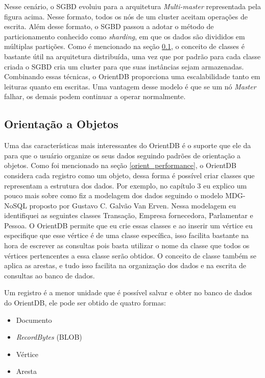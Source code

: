 	Nesse cenário, o SGBD evoluiu para a arquitetura \textit{Multi-master} representada pela figura acima. Nesse formato, todos os nós de um cluster aceitam operações de escrita. Além desse formato, o SGBD passou a adotar o método de particionamento conhecido como \textit{sharding}, em que os dados são divididos em múltiplas partições. Como é mencionado na seção \ref{orient_object}, o conceito de classes é bastante útil na arquitetura distribuída, uma vez que por padrão para cada classe criada o SGBD cria um cluster para que suas instâncias sejam armazenadas. Combinando essas técnicas, o OrientDB proporciona uma escalabilidade tanto em leituras quanto em escritas. Uma vantagem desse modelo é que se um nó \textit{Master} falhar, os demais podem continuar a operar normalmente.

\subsection{Orientação a Objetos} \label{orient_object}

	Uma das características mais interessantes do OrientDB é o suporte que ele da para que o usuário organize os seus dados seguindo padrões de orientação a objetos. Como foi mencionado na seção \ref{orient_performance}, o OrientDB considera cada registro como um objeto, dessa forma é possível criar classes que representam a estrutura dos dados. Por exemplo, no capítulo 3 eu explico um pouco mais sobre como fiz a modelagem dos dados seguindo o modelo MDG-NoSQL proposto por Gustavo C. Galvão Van Erven\cite{mdgnosql}. Nessa modelagem eu identifiquei as seguintes classes Transação, Empresa fornecedora, Parlamentar e Pessoa. O OrientDB permite que eu crie essas classes e ao inserir um vértice eu especifique que esse vértice é de uma classe específica, isso facilita bastante na hora de escrever as consultas pois basta utilizar o nome da classe que todos os vértices pertencentes a essa classe serão obtidos. O conceito de classe também se aplica as arestas, e tudo isso facilita na organização dos dados e na escrita de consultas ao banco de dados.
	
	Um registro é a menor unidade que é possível salvar e obter no banco de dados do OrientDB, ele pode ser obtido de quatro formas:
	
	\begin{itemize}
		\item Documento
		\item \textit{RecordBytes} (BLOB)
		\item Vértice
		\item Aresta
	\end{itemize}
	
